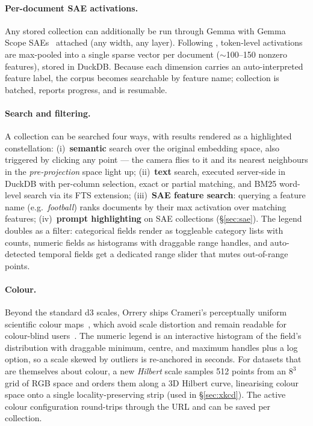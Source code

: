 \paragraph{Per-document SAE activations.}
Any stored collection can additionally be run through Gemma with Gemma Scope SAEs~\cite{lieberum2024gemmascope} attached (any width, any layer). Following \citet{jiang2025interpretableembeddingssparseautoencoders}, token-level activations are max-pooled into a single sparse vector per document ($\sim$100--150 nonzero features), stored in DuckDB. Because each dimension carries an auto-interpreted feature label, the corpus becomes searchable by feature name; collection is batched, reports progress, and is resumable.

\paragraph{Search and filtering.}
A collection can be searched four ways, with results rendered as a highlighted constellation: (i)~\textbf{semantic} search over the original embedding space, also triggered by clicking any point --- the camera flies to it and its nearest neighbours in the \emph{pre-projection} space light up; (ii)~\textbf{text} search, executed server-side in DuckDB with per-column selection, exact or partial matching, and BM25 word-level search via its FTS extension; (iii)~\textbf{SAE feature search}: querying a feature name (e.g.\ \emph{football}) ranks documents by their max activation over matching features; (iv)~\textbf{prompt highlighting} on SAE collections (\S\ref{sec:sae}). The legend doubles as a filter: categorical fields render as toggleable category lists with counts, numeric fields as histograms with draggable range handles, and auto-detected temporal fields get a dedicated range slider that mutes out-of-range points.

\paragraph{Colour.}
Beyond the standard d3 scales, Orrery ships Crameri's perceptually uniform scientific colour maps~\cite{crameri2018scientific}, which avoid scale distortion and remain readable for colour-blind users~\cite{crameri2020misuse}. The numeric legend is an interactive histogram of the field's distribution with draggable minimum, centre, and maximum handles plus a log option, so a scale skewed by outliers is re-anchored in seconds. For datasets that are themselves about colour, a new \emph{Hilbert} scale samples 512 points from an $8^3$ grid of RGB space and orders them along a 3D Hilbert curve, linearising colour space onto a single locality-preserving strip (used in \S\ref{sec:xkcd}). The active colour configuration round-trips through the URL and can be saved per collection.

